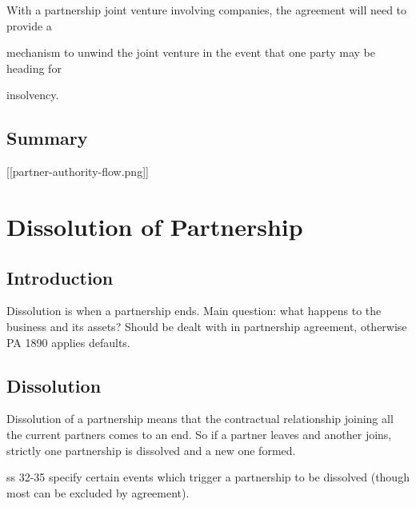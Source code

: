 \documentclass[
]{article}
\newenvironment{Shaded}{}{}
\newcommand{\NormalTok}[1]{#1}
\begin{document}
With a partnership joint venture involving companies, the agreement will
need to provide a

mechanism to unwind the joint venture in the event that one party may be
heading for

insolvency.

\hypertarget{summary}{%
\subsection{Summary}\label{summary}}

{[}{[}partner-authority-flow.png{]}{]}

\hypertarget{dissolution-of-partnership}{%
\section{Dissolution of Partnership}\label{dissolution-of-partnership}}

\hypertarget{introduction-4}{%
\subsection{Introduction}\label{introduction-4}}

Dissolution is when a partnership ends. Main question: what happens to
the business and its assets? Should be dealt with in partnership
agreement, otherwise PA 1890 applies defaults.

\hypertarget{dissolution}{%
\subsection{Dissolution}\label{dissolution}}

\begin{Shaded}
\begin{Highlighting}[]
\NormalTok{Dissolution of a partnership means that the contractual relationship joining all the current partners comes to an end. So if a partner leaves and another joins, strictly one partnership is dissolved and a new one formed. }
\end{Highlighting}
\end{Shaded}

ss 32-35 specify certain events which trigger a partnership to be
dissolved (though most can be excluded by agreement).
\end{document}

